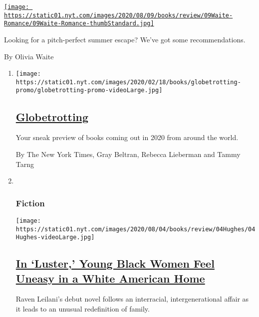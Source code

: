 \begin{enumerate}
\begin{enumerate}
    \href{/2020/08/07/books/review/summer-romance-novels-vanessa-riley.html}{\texttt{[image: https://static01.nyt.com/images/2020/08/09/books/review/09Waite-Romance/09Waite-Romance-thumbStandard.jpg]}}

    Looking for a pitch-perfect summer escape? We've got some
    recommendations.

    By Olivia Waite
  \end{enumerate}
\end{enumerate}

\begin{enumerate}
\def\labelenumi{\arabic{enumi}.}
\item
  \texttt{[image: https://static01.nyt.com/images/2020/02/18/books/globetrotting-promo/globetrotting-promo-videoLarge.jpg]}

  \hypertarget{globetrotting}{%
  \subsection{\texorpdfstring{\href{/interactive/2020/01/08/books/new-books-international.html}{Globetrotting}}{Globetrotting}}\label{globetrotting}}

  Your sneak preview of books coming out in 2020 from around the world.

  By The New York Times, Gray Beltran, Rebecca Lieberman and Tammy Tarng
\item ~
  \hypertarget{fiction-1}{%
  \subsubsection{Fiction}\label{fiction-1}}

  \texttt{[image: https://static01.nyt.com/images/2020/08/04/books/review/04Hughes/04Hughes-videoLarge.jpg]}

  \hypertarget{in-luster-young-black-women-feel-uneasy-in-a-white-american-home}{%
  \subsection{\texorpdfstring{\href{/2020/08/06/books/review/raven-leilani-luster.html}{In
  `Luster,' Young Black Women Feel Uneasy in a White American
  Home}}{In `Luster,' Young Black Women Feel Uneasy in a White American Home}}\label{in-luster-young-black-women-feel-uneasy-in-a-white-american-home}}

  Raven Leilani's debut novel follows an interracial, intergenerational
  affair as it leads to an unusual redefinition of family.


\end{enumerate}
